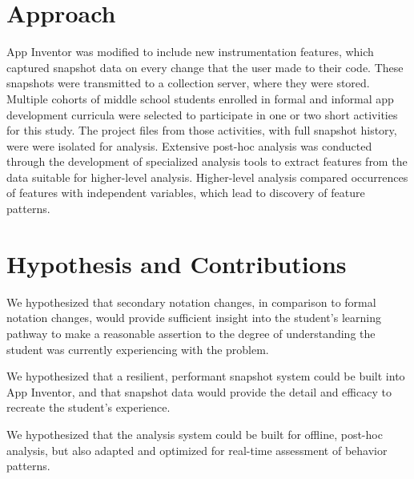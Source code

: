 \section{Approach}
App Inventor was modified to include new instrumentation features, which captured snapshot data on every change that the user made to their code. These snapshots were transmitted to a collection server, where they were stored. Multiple cohorts of middle school students enrolled in formal and informal app development curricula were selected to participate in one or two short activities for this study. The project files from those activities, with full snapshot history, were were isolated for analysis. Extensive post-hoc analysis was conducted through the development of specialized analysis tools to extract features from the data suitable for higher-level analysis. Higher-level analysis compared occurrences of features with independent variables, which lead to discovery of feature patterns.


\section{Hypothesis and Contributions}
We hypothesized that secondary notation changes, in comparison to formal notation changes, would provide sufficient insight into the student's learning pathway to make a reasonable assertion to the degree of understanding the student was currently experiencing with the problem.

We hypothesized that a resilient, performant snapshot system could be built into App Inventor, and that snapshot data would provide the detail and efficacy to recreate the student's experience.

We hypothesized that the analysis system could be built for offline, post-hoc analysis, but also adapted and optimized for real-time assessment of behavior patterns. 

